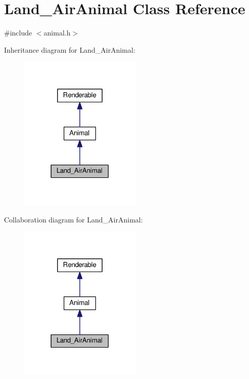 \hypertarget{classLand__AirAnimal}{}\section{Land\+\_\+\+Air\+Animal Class Reference}
\label{classLand__AirAnimal}


{\ttfamily \#include $<$animal.\+h$>$}



Inheritance diagram for Land\+\_\+\+Air\+Animal\+:
\nopagebreak
\begin{figure}[H]
\begin{center}
\leavevmode
\includegraphics[width=165pt]{classLand__AirAnimal__inherit__graph}
\end{center}
\end{figure}


Collaboration diagram for Land\+\_\+\+Air\+Animal\+:
\nopagebreak
\begin{figure}[H]
\begin{center}
\leavevmode
\includegraphics[width=165pt]{classLand__AirAnimal__coll__graph}
\end{center}
\end{figure}
